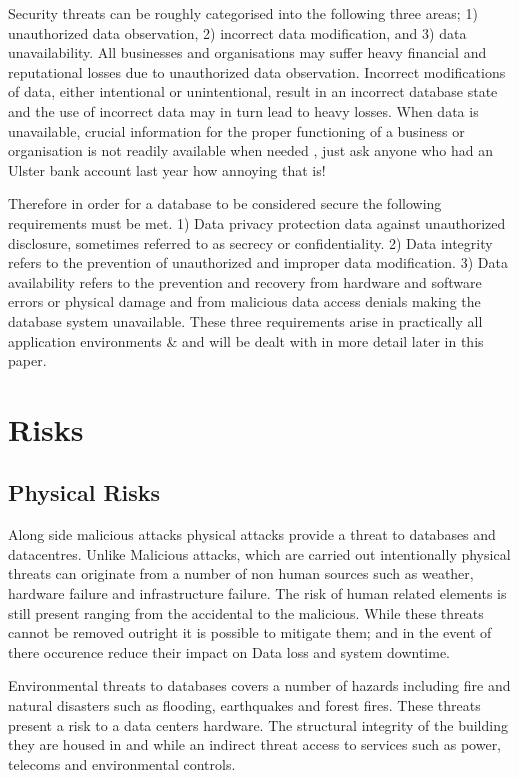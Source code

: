 \documentclass[11pt, twocolumn]{article}
\begin{document}
Security threats can be roughly categorised into the following three areas; 1) unauthorized data observation, 2) incorrect data modification, and 3) data unavailability.  All businesses and organisations may suffer heavy financial and reputational losses due to unauthorized data observation. Incorrect modifications of data, either intentional or unintentional, result in an incorrect database state and the use of incorrect data may in turn lead to heavy losses.  When data is unavailable, crucial information for the proper functioning of a business or organisation is not readily available when needed \cite{BerSand}, just ask anyone who had an Ulster bank account last year how annoying that is!  

Therefore in order for a database to be considered secure the following requirements must be met.  1) Data privacy protection data against unauthorized disclosure, sometimes referred to as secrecy or confidentiality.  2) Data integrity refers to the prevention of unauthorized and improper data modification.  3) Data availability refers to the prevention and recovery from hardware and software errors or physical damage and from malicious data access denials making the database system unavailable. These three requirements arise in practically all application environments \cite{BerSand}\&\cite{Thur} and will be dealt with in more detail later in this paper.


\section{Risks}

\subsection{Physical Risks}
Along side malicious attacks physical attacks provide a threat to databases and datacentres. Unlike Malicious attacks, which are carried out intentionally physical threats can originate from a number of non human sources such as weather, hardware failure and infrastructure failure. The risk of human related elements is still present ranging from the accidental to the malicious.  While these threats cannot be removed outright it is possible to mitigate them; and in the event of there occurence reduce their impact on Data loss and system downtime.	 


Environmental threats to databases covers a number of hazards including fire  and natural disasters such as flooding, earthquakes and forest fires.  These threats present a risk to a data centers hardware.  The structural integrity of the building they are housed in and while an indirect threat access to services such as power, telecoms and environmental controls.
\end{document}
